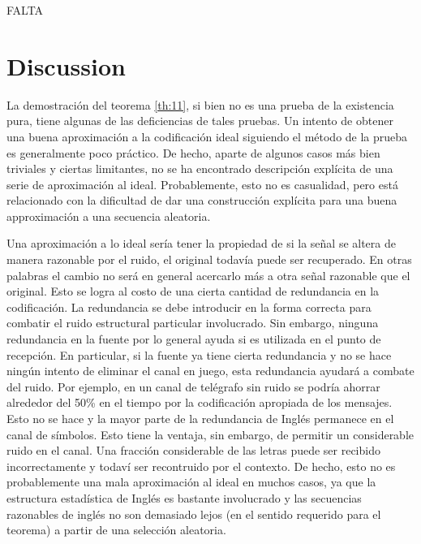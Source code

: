 FALTA

\clearpage

\chapter{Discussion}
\label{sec:14}

La demostraci\'{o}n del teorema \ref{th:11}, si bien no es una prueba de la existencia pura,  tiene algunas de las deficiencias de tales pruebas. Un intento de obtener una buena aproximaci\'{o}n a la codificaci\'{o}n ideal siguiendo el m\'{e}todo de la prueba es generalmente poco pr\'{a}ctico. De hecho, aparte de algunos casos m\'{a}s bien triviales y ciertas limitantes, no se ha encontrado descripci\'{o}n expl\'{i}cita de una serie de aproximaci\'{o}n al ideal. Probablemente, esto no es casualidad, pero est\'{a} relacionado con la dificultad de dar una construcci\'{o}n expl\'{i}cita para una buena approximaci\'{o}n a una secuencia aleatoria.

Una aproximaci\'{o}n a lo ideal ser\'{i}a tener la propiedad de si la se\~{n}al  se altera de manera razonable por el ruido, el original todav\'{i}a puede ser recuperado. En otras palabras el cambio no ser\'{a} en general acercarlo m\'{a}s a otra se\~{n}al razonable que el original. Esto se logra al costo de una cierta cantidad de redundancia en la codificaci\'{o}n. La redundancia se debe introducir en la forma correcta para combatir el ruido estructural particular involucrado. Sin embargo, ninguna redundancia en la fuente por lo general ayuda si es utilizada en el punto de recepci\'{o}n. En particular, si la fuente ya tiene cierta redundancia y no se hace ning\'{u}n intento de eliminar el canal en juego, esta redundancia ayudar\'{a} a combate del ruido. Por ejemplo, en un canal de tel\'{e}grafo sin ruido se podr\'{i}a ahorrar alrededor del 50\% en el tiempo por la codificaci\'{o}n apropiada de los mensajes. Esto no se hace y la mayor parte de la redundancia de Ingl\'{e}s permanece en el canal de s\'{i}mbolos. Esto tiene la ventaja, sin embargo, de permitir un considerable ruido en el canal. Una fracci\'{o}n considerable de las letras puede ser recibido incorrectamente y todav\'{i} ser recontruido por el contexto. De hecho, esto no es probablemente una mala aproximaci\'{o}n al ideal en muchos casos, ya que la estructura estad\'{i}stica de Ingl\'{e}s es bastante involucrado y las secuencias razonables de ingl\'{e}s no son demasiado lejos (en el sentido requerido para el teorema) a partir de una selecci\'{o}n aleatoria.

